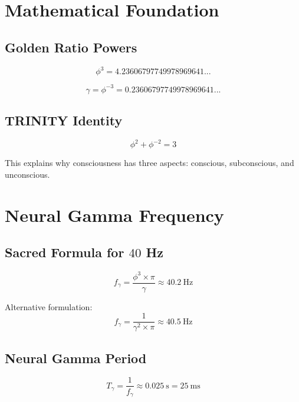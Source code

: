 \documentclass[12pt,a4paper]{article}
\begin{document}
\section{Mathematical Foundation}

\subsection{Golden Ratio Powers}

\begin{equation}
\phi^3 = 4.23606797749978969641...
\end{equation}

\begin{equation}
\gamma = \phi^{-3} = 0.23606797749978969641...
\end{equation}

\subsection{TRINITY Identity}

\begin{equation}
\phi^2 + \phi^{-2} = 3
\end{equation}

This explains why consciousness has three aspects: conscious, subconscious, and unconscious.

\section{Neural Gamma Frequency}

\subsection{Sacred Formula for $40$ Hz}

\begin{equation}
f_\gamma = \frac{\phi^3 \times \pi}{\gamma} \approx 40.2~\text{Hz}
\end{equation}

Alternative formulation:
\begin{equation}
f_\gamma = \frac{1}{\gamma^2 \times \pi} \approx 40.5~\text{Hz}
\end{equation}

\subsection{Neural Gamma Period}

\begin{equation}
T_\gamma = \frac{1}{f_\gamma} \approx 0.025~\text{s} = 25~\text{ms}
\end{equation}
\end{document}
